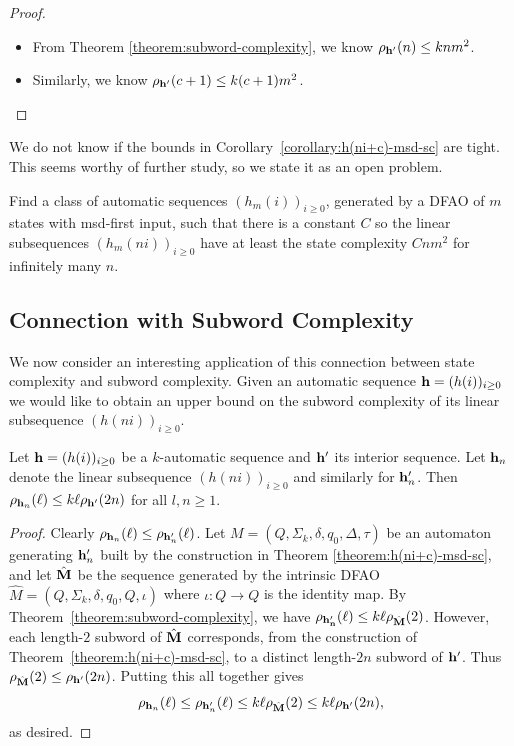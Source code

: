 \documentclass[12pt,reqno]{article}
\begin{document}
\begin{proof}
\leavevmode
\begin{itemize}
    \item[(a)]
    From Theorem \ref{theorem:subword-complexity}, we know $\rho_{{\bf h}'} (n) \leq knm^2$.
    \item[(b)]
    Similarly, we know $ \rho_{{\bf h}'} (c+1) \leq k(c+1)m^2$.
    \end{itemize}
\end{proof}

We do not know if the bounds in
Corollary~\ref{corollary:h(ni+c)-msd-sc} are tight.  This seems worthy of further study, so we state it as an open problem.
\begin{openproblem}
Find a class of automatic sequences
$(h_m(i))_{i \geq 0}$, generated by a DFAO of $m$ states with msd-first input, such that there is a constant $C$ so the linear subsequences
$(h_m(ni))_{i \geq 0}$ have at least the state complexity $C n m^2$ for
infinitely many $n$.
\end{openproblem}

\subsection{Connection with Subword Complexity}

We now consider an interesting application of this connection between state complexity and subword complexity.  Given an automatic sequence ${\bf h} = (h(i))_{i \geq 0}$ we would like to obtain an upper bound on the subword complexity of its linear subsequence $(h(ni))_{i \geq 0}$. 
\begin{theorem} \label{theorem:rho-h(ni)}
   Let ${\bf h} = (h(i))_{i \geq 0}$ be a $k$-automatic sequence and
   ${\bf h}'$ its interior sequence.  Let
   ${\bf h}_n$ denote the
   linear subsequence
   $(h(ni))_{i \geq 0}$ and
   similarly for
   ${\bf h}'_n$.
   Then $\rho_{{\bf h}_n} (\ell) \leq k \ell \rho_{{\bf h}'} (2n)$ for all $l, n \geq 1$.
\end{theorem}
\begin{proof}
    Clearly $\rho_{{\bf h}_n}(\ell) \leq \rho_{{\bf h}'_n}(\ell)$.
    Let $M=(Q, \Sigma_k, \delta, q_0, \Delta, \tau)$ be an automaton generating ${\bf h}'_n$ built by the construction in Theorem \ref{theorem:h(ni+c)-msd-sc}, and let $\hat{\bf M}$ be the sequence generated by the intrinsic DFAO  $\hat{M}=(Q, \Sigma_k, \delta, q_0, Q, \iota)$ where $\iota:Q \rightarrow  Q$ is the identity map.
    By Theorem~\ref{theorem:subword-complexity}, we have $\rho_{\bf h_n'}(\ell) \leq k \ell\rho_{\hat{\bf M}}(2)$. However, each length-$2$ subword of $\hat{\bf M}$ corresponds, from the construction of  Theorem~\ref{theorem:h(ni+c)-msd-sc}, to a distinct length-$2n$ subword of ${\bf h}'$.  Thus $\rho_{\hat{\bf M}} (2) \leq \rho_{{\bf h}'} (2n)$.  Putting this all together gives
    $$\rho_{{\bf h}_n} (\ell) \leq \rho_{{\bf h}'_n} (\ell) \leq k \ell \rho_{\hat{\bf M}}(2) \leq k \ell \rho_{{\bf h}'} (2n),$$
as desired.
 \end{proof}
\end{document}
